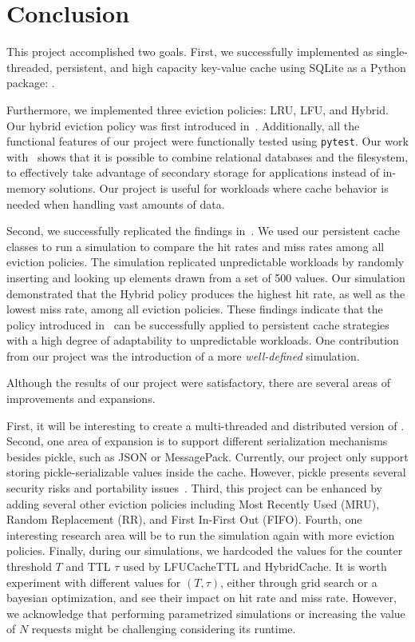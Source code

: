 \section{Conclusion}
This project accomplished two goals. First,
we successfully implemented as single-threaded,
persistent, and high capacity key-value cache using
SQLite as a Python package: \sqlitecache.

Furthermore,
we implemented three eviction policies:
LRU, LFU, and Hybrid. Our hybrid eviction
policy was first introduced in~\cite{shah2023ImprovedCacheEviction}.
Additionally, all the functional features of our project
were functionally tested using \texttt{pytest}.
Our work with \sqlitecache~shows that it is possible to combine
relational databases and the filesystem, to effectively
take advantage of secondary storage for applications instead
of in-memory solutions. Our project is useful for workloads
where cache behavior is needed when handling
vast amounts of data.

Second, we successfully replicated the findings in~\cite{shah2023ImprovedCacheEviction}.
We used our persistent cache classes
to run a simulation to compare the hit rates and miss rates
among all eviction policies. The simulation
replicated unpredictable workloads by randomly inserting
and looking up elements drawn from a set of 500 values.
Our simulation demonstrated that the Hybrid policy
produces the highest hit rate, as well
as the lowest miss rate, among all eviction policies.
These findings indicate that the policy introduced in~\cite{shah2023ImprovedCacheEviction}
can be successfully applied to persistent cache strategies
with a high degree of adaptability to unpredictable workloads.
One contribution from our project was the introduction
of a more \textit{well-defined} simulation.

Although the results of our project were satisfactory,
there are several areas of improvements and expansions.

First, it will be interesting to create a multi-threaded and
distributed version of \sqlitecache.
Second, one area of expansion is to support different
serialization mechanisms besides pickle, such as JSON or
MessagePack.
Currently, our project only support storing pickle-serializable
values inside the cache. However, pickle presents
several security risks and portability issues~\cite{arjancodesPickle}.
Third, this project can be enhanced by adding
several other eviction policies including
Most Recently Used (MRU), Random Replacement (RR),
and First In-First Out (FIFO). Fourth,
one interesting research area will be to run
the simulation again with more eviction policies.
Finally, during our simulations, we hardcoded
the values for the counter threshold $T$ and TTL $\tau$
used by LFUCacheTTL and HybridCache. It is worth
experiment with different values for $(T, \tau)$,
either through grid search or a bayesian optimization,
and see their impact on hit rate and miss rate.
However, we acknowledge that performing parametrized
simulations or increasing the value of $N$ requests
might be challenging considering its runtime.